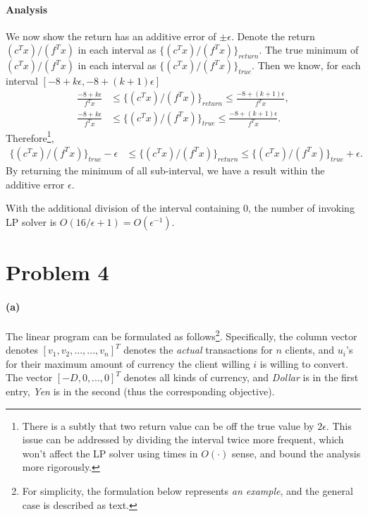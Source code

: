 \documentclass[12pt]{article}
\begin{document}
\paragraph{Analysis} We now show the return has an additive error of $\pm\epsilon$. Denote the return $(c^Tx)/(f^Tx)$ in each interval as $\big\{(c^Tx)/(f^Tx)\big\}_{return}$. The true minimum of $(c^Tx)/(f^Tx)$ in each interval as $\big\{(c^Tx)/(f^Tx)\big\}_{true}$. Then we know, for each interval $[-8 + k\epsilon, -8 + (k+1)\epsilon]$
\begin{align*}
\frac{-8 + k\epsilon}{f^Tx} &\leq \big\{(c^Tx)/(f^Tx)\big\}_{return} \leq \frac{-8 + (k+1)\epsilon}{f^Tx},\\
\frac{-8 + k\epsilon}{f^Tx} &\leq \big\{(c^Tx)/(f^Tx)\big\}_{true} \leq \frac{-8 + (k+1)\epsilon}{f^Tx}.
\end{align*}
Therefore\footnote{There is a subtly that two return value can be off the true value by $2\epsilon$. This issue can be addressed by dividing the interval twice more frequent, which won't affect the LP solver using times in $O(\cdot)$ sense, and bound the analysis more rigorously.}, 
\begin{align*}
\big\{(c^Tx)/(f^Tx)\big\}_{true} - \epsilon &\leq \big\{(c^Tx)/(f^Tx)\big\}_{return} \leq \big\{(c^Tx)/(f^Tx)\big\}_{true} +\epsilon.
\end{align*}
By returning the minimum of all sub-interval, we have a result within the additive error $\epsilon$.

With the additional division of the interval containing $0$, the number of invoking LP solver is $O(16/\epsilon + 1) = O(\epsilon^{-1})$.

\newpage

\section*{Problem 4}
\paragraph{(a)}
The linear program can be formulated as follows\footnote{For simplicity, the formulation below represents \emph{an example}, and the general case is described as text.}. Specifically, the column vector denotes $[v_1, v_2, ..., ..., v_n]^T$ denotes the \emph{actual} transactions for $n$ clients, and $u_i$'s for their maximum amount of currency the client willing $i$ is willing to convert. The vector $[-D, 0, ..., 0]^T$ denotes all kinds of currency, and \emph{Dollar} is in the first entry, \emph{Yen} is in the second (thus the corresponding objective). 
\end{document}
